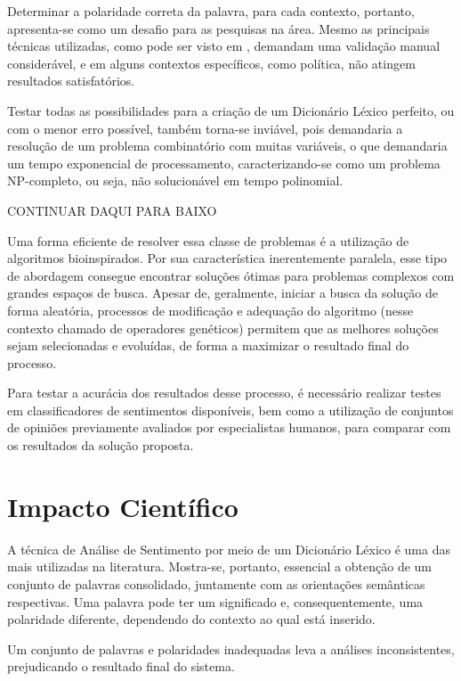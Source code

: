 \documentclass[a4paper,11pt]{article}
\begin{document}
Determinar a polaridade correta da palavra, para cada contexto, portanto, apresenta-se como um desafio para as pesquisas na área. Mesmo as principais técnicas utilizadas, como pode ser visto em \cite{taboada2011lexicon}, demandam uma validação manual considerável, e em alguns contextos específicos, como política, não atingem resultados satisfatórios.

Testar todas as possibilidades para a criação de um Dicionário Léxico perfeito, ou com o menor erro possível, também torna-se inviável, pois demandaria a resolução de um problema combinatório com muitas variáveis, o que demandaria um tempo exponencial de processamento, caracterizando-se como um problema NP-completo, ou seja, não solucionável em tempo polinomial.


CONTINUAR DAQUI PARA BAIXO

Uma forma eficiente de resolver essa classe de problemas é a utilização de algoritmos bioinspirados. Por sua característica inerentemente paralela, esse tipo de abordagem consegue encontrar soluções ótimas para problemas complexos com grandes espaços de busca. Apesar de, geralmente, iniciar a busca da solução de forma aleatória, processos de modificação e adequação do algoritmo (nesse contexto chamado de operadores genéticos) permitem que as melhores soluções sejam selecionadas e evoluídas, de forma a maximizar o resultado final do processo.

Para testar a acurácia dos resultados desse processo, é necessário realizar testes em classificadores de sentimentos disponíveis, bem como a utilização de conjuntos de opiniões previamente avaliados por especialistas humanos, para comparar com os resultados da solução proposta.



\section{Impacto Científico}
\label{sec:impact}
A técnica de Análise de Sentimento por meio de um Dicionário Léxico é uma das mais utilizadas na literatura. Mostra-se, portanto, essencial a obtenção de um conjunto de palavras consolidado, juntamente com as orientações semânticas respectivas. 
Uma palavra pode ter um significado e, consequentemente, uma polaridade diferente, dependendo do contexto ao qual está inserido. 

Um conjunto de palavras e polaridades inadequadas leva a análises inconsistentes, prejudicando o resultado final do sistema.
\end{document}
